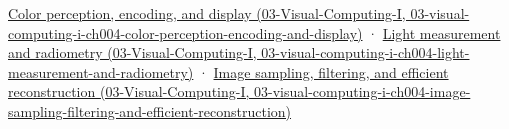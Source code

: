 \href{../03-Visual-Computing-I/main.pdf\#nameddest=03-visual-computing-i-ch004-color-perception-encoding-and-display}{Color perception, encoding, and display (03-Visual-Computing-I, 03-visual-computing-i-ch004-color-perception-encoding-and-display)} · \href{../03-Visual-Computing-I/main.pdf\#nameddest=03-visual-computing-i-ch004-light-measurement-and-radiometry}{Light measurement and radiometry (03-Visual-Computing-I, 03-visual-computing-i-ch004-light-measurement-and-radiometry)} · \href{../03-Visual-Computing-I/main.pdf\#nameddest=03-visual-computing-i-ch004-image-sampling-filtering-and-efficient-reconstruction}{Image sampling, filtering, and efficient reconstruction (03-Visual-Computing-I, 03-visual-computing-i-ch004-image-sampling-filtering-and-efficient-reconstruction)}
